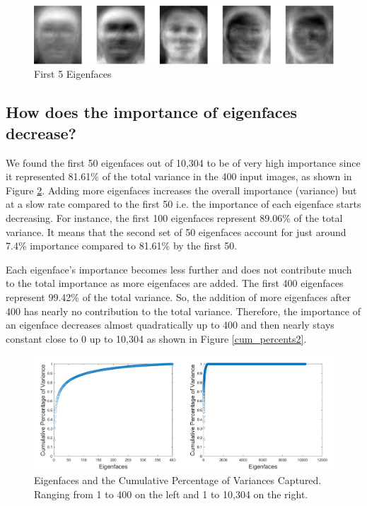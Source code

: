 \documentclass[letterpaper,12pt]{article}
\begin{document}

\begin{figure}[htp]
    \centering
    \includegraphics[width=15cm]{5faces}
    \caption{First 5 Eigenfaces}
    \label{5faces}
\end{figure}


\subsection{How does the importance of eigenfaces decrease?}\label{Q1.2}

We found the first 50 eigenfaces out of 10,304 to be of very high importance since it represented 81.61\% of the total variance in the 400 input images, as shown in Figure \ref{cum_percents}. Adding more eigenfaces increases the overall importance (variance) but at a slow rate compared to the first 50 i.e. the importance of each eigenface starts decreasing. For instance, the first 100 eigenfaces represent 89.06\% of the total variance. It means that the second set of 50 eigenfaces account for just around 7.4\% importance compared to 81.61\% by the first 50. 

Each eigenface's importance becomes less further and does not contribute much to the total importance as more eigenfaces are added. The first 400 eigenfaces represent 99.42\% of the total variance. So, the addition of more eigenfaces after 400 has nearly no contribution to the total variance. Therefore, the importance of an eigenface decreases almost quadratically up to 400 and then nearly stays constant close to 0 up to 10,304 as shown in Figure \ref{cum_percents2}.


\begin{figure}[htp]
    \centering
    \includegraphics[width=14cm]{cum_percents.png}
    \caption{Eigenfaces and the Cumulative Percentage of Variances Captured. Ranging from 1 to 400 on the left and 1 to 10,304 on the right.}
    \label{cum_percents}
\end{figure}
\end{document}
